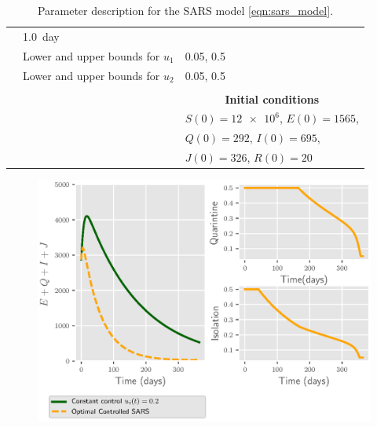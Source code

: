 \begin{table}[htb]
\begin{center}
\begin{tabular}{@{}rll@{}}
          & \SI{1.0}{day}
        \\
          & Lower and upper bounds for $u_1$
          & \num{.05}, \num{0.5}
        \\
          & Lower and upper bounds for $u_2$
          & \num{.05}, \num{0.5}
        \\
        \\
         && \multicolumn{1}{c}{\bf{Initial conditions}}
        \\
         \cmidrule{3-3}
         && $S(0)=\num{12e6}$, $E(0)=1565$,
         \\
          && $Q(0)=292$, $I(0)=\num{695}$,
         \\
         && $J(0)=\num{326}$, $R(0)=\num{20}$
        \\
        \bottomrule
      \end{tabular}
     \caption{Parameter description for the SARS model
     \eqref{eqn:sars_model}.}
     \label{tbl:sars_table}
     \end{center}
\end{table}

\begin{figure}[htb]
  \centering
  \includegraphics{Figures/figure_1_sars}
  \caption{}
  \label{fig:figure1sars}
\end{figure}

